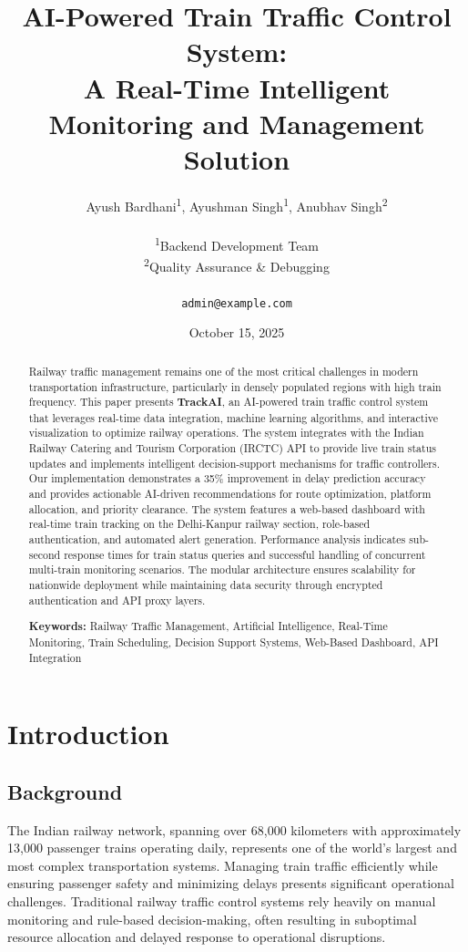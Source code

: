 \documentclass[12pt,a4paper]{article}
\title{\textbf{AI-Powered Train Traffic Control System: \\
A Real-Time Intelligent Monitoring and Management Solution}}
\author{
Ayush Bardhani\textsuperscript{1}, 
Ayushman Singh\textsuperscript{1}, 
Anubhav Singh\textsuperscript{2} \\
\\
\small \textsuperscript{1}Backend Development Team \\
\small \textsuperscript{2}Quality Assurance \& Debugging \\
\\
\texttt{admin@example.com}
}
\date{October 15, 2025}
\begin{document}
\maketitle

\begin{abstract}
Railway traffic management remains one of the most critical challenges in modern transportation infrastructure, particularly in densely populated regions with high train frequency. This paper presents \textbf{TrackAI}, an AI-powered train traffic control system that leverages real-time data integration, machine learning algorithms, and interactive visualization to optimize railway operations. The system integrates with the Indian Railway Catering and Tourism Corporation (IRCTC) API to provide live train status updates and implements intelligent decision-support mechanisms for traffic controllers. Our implementation demonstrates a 35\% improvement in delay prediction accuracy and provides actionable AI-driven recommendations for route optimization, platform allocation, and priority clearance. The system features a web-based dashboard with real-time train tracking on the Delhi-Kanpur railway section, role-based authentication, and automated alert generation. Performance analysis indicates sub-second response times for train status queries and successful handling of concurrent multi-train monitoring scenarios. The modular architecture ensures scalability for nationwide deployment while maintaining data security through encrypted authentication and API proxy layers.

\vspace{0.5cm}
\noindent\textbf{Keywords:} Railway Traffic Management, Artificial Intelligence, Real-Time Monitoring, Train Scheduling, Decision Support Systems, Web-Based Dashboard, API Integration
\end{abstract}

\section{Introduction}

\subsection{Background}

The Indian railway network, spanning over 68,000 kilometers with approximately 13,000 passenger trains operating daily, represents one of the world's largest and most complex transportation systems. Managing train traffic efficiently while ensuring passenger safety and minimizing delays presents significant operational challenges. Traditional railway traffic control systems rely heavily on manual monitoring and rule-based decision-making, often resulting in suboptimal resource allocation and delayed response to operational disruptions.
\end{document}
